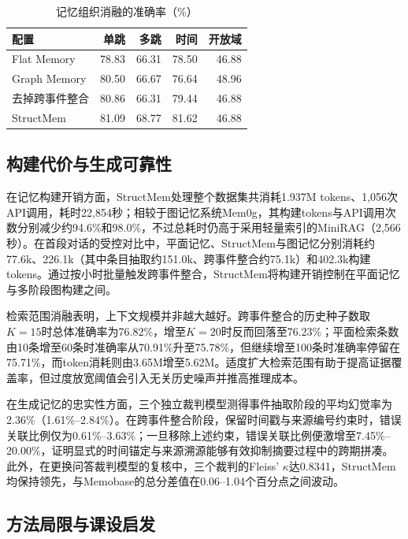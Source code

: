 \begin{table}[!htbp]
\centering\small
\caption{记忆组织消融的准确率（\%）}
\label{tab:structmem-ablation}
\begin{tabular}{@{}lrrrr@{}}
\toprule
配置 & 单跳 & 多跳 & 时间 & 开放域\\
\midrule
Flat Memory & 78.83 & 66.31 & 78.50 & 46.88\\
Graph Memory & 80.50 & 66.67 & 76.64 & 48.96\\
去掉跨事件整合 & 80.86 & 66.31 & 79.44 & 46.88\\
StructMem & 81.09 & 68.77 & 81.62 & 46.88\\
\bottomrule
\end{tabular}
\end{table}

\subsection{构建代价与生成可靠性}

在记忆构建开销方面，StructMem处理整个数据集共消耗1.937M tokens、1,056次API调用，耗时22,854秒；相较于图记忆系统Mem0g，其构建tokens与API调用次数分别减少约94.6\%和98.0\%，不过总耗时仍高于采用轻量索引的MiniRAG（2,566秒）。在首段对话的受控对比中，平面记忆、StructMem与图记忆分别消耗约77.6k、226.1k（其中条目抽取约151.0k、跨事件整合约75.1k）和402.3k构建tokens。通过按小时批量触发跨事件整合，StructMem将构建开销控制在平面记忆与多阶段图构建之间。

检索范围消融表明，上下文规模并非越大越好。跨事件整合的历史种子数取$K=15$时总体准确率为76.82\%，增至$K=20$时反而回落至76.23\%；平面检索条数由10条增至60条时准确率从70.91\%升至75.78\%，但继续增至100条时准确率停留在75.71\%，而token消耗则由3.65M增至5.62M。适度扩大检索范围有助于提高证据覆盖率，但过度放宽阈值会引入无关历史噪声并推高推理成本。

在生成记忆的忠实性方面，三个独立裁判模型测得事件抽取阶段的平均幻觉率为2.36\%（1.61\%--2.84\%）。在跨事件整合阶段，保留时间戳与来源编号约束时，错误关联比例仅为0.61\%--3.63\%；一旦移除上述约束，错误关联比例便激增至7.45\%--20.00\%，证明显式的时间锚定与来源溯源能够有效抑制摘要过程中的跨期拼凑。此外，在更换问答裁判模型的复核中，三个裁判的Fleiss' $\kappa$达0.8341，StructMem均保持领先，与Memobase的总分差值在0.06--1.04个百分点之间波动。

\subsection{方法局限与课设启发}

